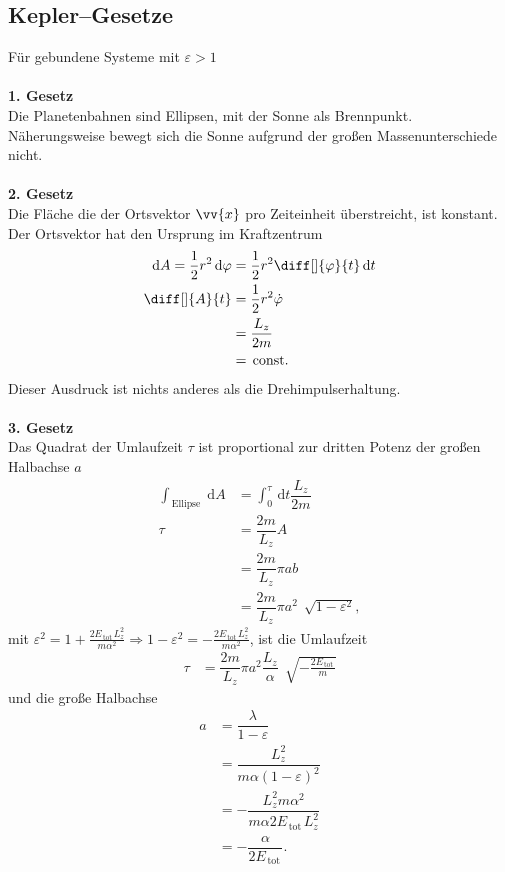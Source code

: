 \documentclass[a4paper,12pt]{article}
\newcommand{\td}{\,\text{d}}
\numberwithin{equation}{section}
\begin{document}
\subsection{Kepler--Gesetze}
Für gebundene Systeme mit $\varepsilon >1$ 
\\\hfill\\\textbf{1. Gesetz}\\ 
Die Planetenbahnen sind Ellipsen, mit der Sonne als Brennpunkt. Näherungsweise bewegt sich die Sonne aufgrund der großen Massenunterschiede nicht.
\\\hfill\\\textbf{2. Gesetz}\\ 
Die Fläche die der Ortsvektor $\vv{x}$ pro Zeiteinheit überstreicht, ist konstant. Der Ortsvektor hat den Ursprung im Kraftzentrum
\begin{align*}
        \td A=\dfrac{1}{2}r^2\td \varphi &=\dfrac{1}{2}r^2\diff[]{\varphi }{t}\td t\\
        \diff[]{A}{t}&=\dfrac{1}{2}r^2\dot{\varphi }\\
                     &=\dfrac{L_z}{2m}\\
                     &=\,\text{const.}\,
\end{align*}
Dieser Ausdruck ist nichts anderes als die Drehimpulserhaltung.
\\\hfill\\\textbf{3. Gesetz}\\ 
Das Quadrat der Umlaufzeit $\tau $ ist proportional zur dritten Potenz der großen Halbachse $a$
\begin{align*}
        \int_{\,\text{Ellipse}\,}^{}\td A&=\int_{0}^{\tau }\td t\dfrac{L_z}{2m}\\
        \tau &=\dfrac{2m}{L_z}A\\
             &=\dfrac{2m}{L_z}\pi ab\\
             &=\dfrac{2m}{L_z}\pi a^2\,\sqrt[]{1-\varepsilon ^2}
,\end{align*}
mit $\varepsilon ^2=1+\tfrac{2E_{\,\text{tot}\,}L_z^2}{m\alpha ^2}\Rightarrow 1-\varepsilon ^2=-\tfrac{2E_{\,\text{tot}\,}L_z^2}{m\alpha ^2}$, ist die Umlaufzeit
\begin{align*}
        \tau &=\dfrac{2m}{L_z}\pi a^2\dfrac{L_z}{\alpha }\,\sqrt[]{-\tfrac{2E_{\,\text{tot}\,}}{m}}
\end{align*}
und die große Halbachse
\begin{align*}
        a&=\dfrac{\lambda }{1-\varepsilon }\\
         &=\dfrac{L_z^2}{m\alpha \left(1-\varepsilon \right)^2}\\
         &=-\dfrac{L_z^2m\alpha ^2}{m\alpha 2E_{\,\text{tot}\,}L_z^2}\\
         &=-\dfrac{\alpha }{2E_{\,\text{tot}\,}}
.\end{align*}
\end{document}
